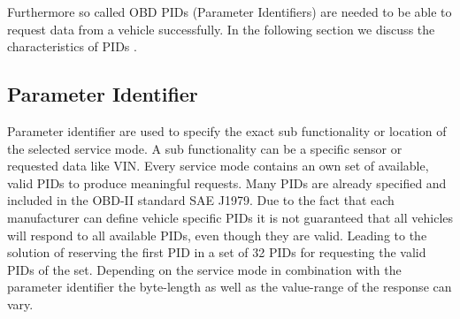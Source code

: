 Furthermore so called OBD PIDs (Parameter Identifiers) are needed to be able to request data from a vehicle successfully. In the following section 
we discuss the characteristics of PIDs \cite{SCHAFOBD1}.

\subsection{Parameter Identifier}
Parameter identifier are used to specify the exact sub functionality or location of the selected service mode. A sub functionality can
be a specific sensor or requested data like VIN. Every service mode contains an own set of available, valid PIDs to produce meaningful requests. Many PIDs are 
already specified and included in the OBD-II standard SAE J1979. Due to the fact that each manufacturer can define vehicle specific PIDs it is not 
guaranteed that all vehicles will respond to all available PIDs, even though they are valid. Leading to the solution of reserving the first PID in a 
set of 32 PIDs for requesting the valid PIDs of the set. Depending on the service mode in combination with the parameter identifier the byte-length 
as well as the value-range of the response can vary. 

